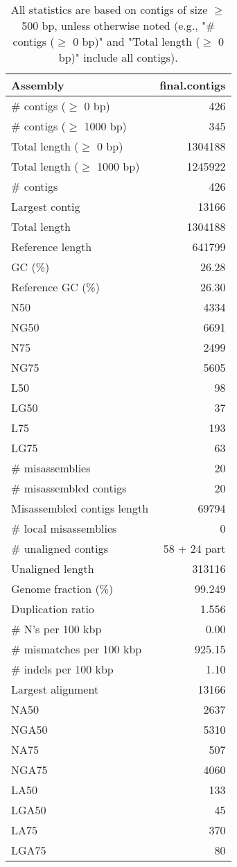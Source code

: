 \documentclass[12pt,a4paper]{article}
\begin{document}
\begin{table}[ht]
\begin{center}
\caption{All statistics are based on contigs of size $\geq$ 500 bp, unless otherwise noted (e.g., "\# contigs ($\geq$ 0 bp)" and "Total length ($\geq$ 0 bp)" include all contigs).}
\begin{tabular}{|l*{1}{|r}|}
\hline
Assembly & final.contigs \\ \hline
\# contigs ($\geq$ 0 bp) & 426 \\ \hline
\# contigs ($\geq$ 1000 bp) & 345 \\ \hline
Total length ($\geq$ 0 bp) & 1304188 \\ \hline
Total length ($\geq$ 1000 bp) & 1245922 \\ \hline
\# contigs & 426 \\ \hline
Largest contig & 13166 \\ \hline
Total length & 1304188 \\ \hline
Reference length & 641799 \\ \hline
GC (\%) & 26.28 \\ \hline
Reference GC (\%) & 26.30 \\ \hline
N50 & 4334 \\ \hline
NG50 & 6691 \\ \hline
N75 & 2499 \\ \hline
NG75 & 5605 \\ \hline
L50 & 98 \\ \hline
LG50 & 37 \\ \hline
L75 & 193 \\ \hline
LG75 & 63 \\ \hline
\# misassemblies & 20 \\ \hline
\# misassembled contigs & 20 \\ \hline
Misassembled contigs length & 69794 \\ \hline
\# local misassemblies & 0 \\ \hline
\# unaligned contigs & 58 + 24 part \\ \hline
Unaligned length & 313116 \\ \hline
Genome fraction (\%) & 99.249 \\ \hline
Duplication ratio & 1.556 \\ \hline
\# N's per 100 kbp & 0.00 \\ \hline
\# mismatches per 100 kbp & 925.15 \\ \hline
\# indels per 100 kbp & 1.10 \\ \hline
Largest alignment & 13166 \\ \hline
NA50 & 2637 \\ \hline
NGA50 & 5310 \\ \hline
NA75 & 507 \\ \hline
NGA75 & 4060 \\ \hline
LA50 & 133 \\ \hline
LGA50 & 45 \\ \hline
LA75 & 370 \\ \hline
LGA75 & 80 \\ \hline
\end{tabular}
\end{center}
\end{table}
\end{document}
